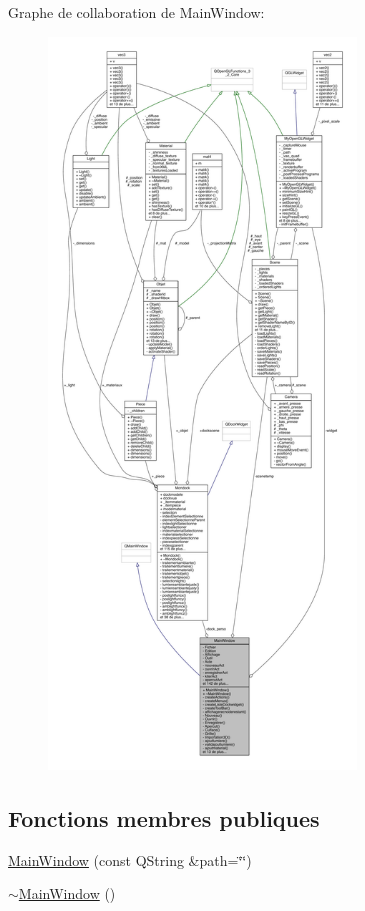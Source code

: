 Graphe de collaboration de Main\+Window\+:
\nopagebreak
\begin{figure}[H]
\begin{center}
\leavevmode
\includegraphics[height=550pt]{class_main_window__coll__graph}
\end{center}
\end{figure}
\subsection*{Fonctions membres publiques}
\begin{DoxyCompactItemize}
\item 
\hyperlink{class_main_window_a6d90fb41049be49da652a628191c9a1d}{Main\+Window} (const Q\+String \&path=\char`\"{}\char`\"{})
\item 
\hyperlink{class_main_window_ae98d00a93bc118200eeef9f9bba1dba7}{$\sim$\+Main\+Window} ()
\end{DoxyCompactItemize}
